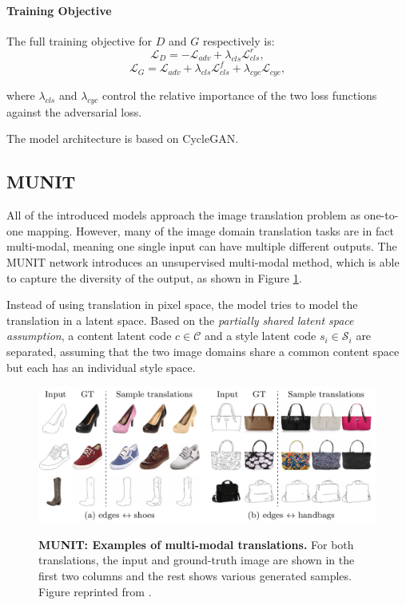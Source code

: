 \documentclass[12pt]{report}
\begin{document}
\paragraph{Training Objective}
The full training objective for $D$ and $G$ respectively is:
\begin{equation}
\mathcal{L}_{D} = -\mathcal{L}_{adv} + \lambda_{cls} \mathcal{L}^{r}_{cls},
\label{eq:stargan_D}
\end{equation}
\begin{equation}
\mathcal{L}_{G} = \mathcal{L}_{adv} + \lambda_{cls} \mathcal{L}^{f}_{cls} + \lambda_{cyc} \mathcal{L}_{cyc},
\label{eq:stargan_G}
\end{equation}

where $\lambda_{cls}$ and $\lambda_{cyc}$ control the relative importance of the two loss functions against the adversarial loss.

The model architecture is based on CycleGAN.


\pagebreak
\subsection{MUNIT}

All of the introduced models approach the image translation problem as one-to-one mapping. However, many of the image domain translation tasks are in fact multi-modal, meaning one single input can have multiple different outputs. The MUNIT network \cite{huang_multimodal_2018} introduces an unsupervised multi-modal method, which is able to capture the diversity of the output, as shown in Figure \ref{fig:munit_example}.

Instead of using translation in pixel space, the model tries to model the translation in a latent space. Based on the \textit{partially shared latent space assumption}, a content latent code $c \in \mathcal{C}$ and a style latent code $s_{i} \in \mathcal{S}_{i}$ are separated, assuming that the two image domains share a common content space but each has an individual style space. 

\begin{figure}[h]
\centering
{\includegraphics[width=\linewidth]{03_analysis/gans/munit_example}}
\caption{\label{fig:munit_example} \textbf{MUNIT: Examples of multi-modal translations.} For both translations, the input and ground-truth image are shown in the first two columns and the rest shows various generated samples. Figure reprinted from \cite{huang_multimodal_2018}.}
\end{figure}
\end{document}
